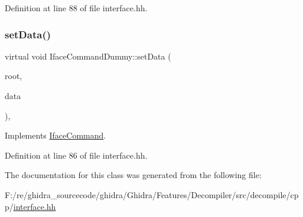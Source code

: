 Definition at line 88 of file interface.\+hh.

\mbox{\label{class_iface_command_dummy_a6cde79d0cd9edb822fa594259de68826}} 
\subsubsection{\texorpdfstring{setData()}{setData()}}
{\footnotesize\ttfamily virtual void Iface\+Command\+Dummy\+::set\+Data (\begin{DoxyParamCaption}\item[{\mbox{\hyperlink{class_iface_status}{Iface\+Status}} $\ast$}]{root,  }\item[{\mbox{\hyperlink{class_iface_data}{Iface\+Data}} $\ast$}]{data }\end{DoxyParamCaption})\hspace{0.3cm}{\ttfamily [inline]}, {\ttfamily [virtual]}}



Implements \mbox{\hyperlink{class_iface_command_ad0a0ba80d392ef1346c43283a8c3ca90}{Iface\+Command}}.



Definition at line 86 of file interface.\+hh.



The documentation for this class was generated from the following file\+:\begin{DoxyCompactItemize}
\item 
F\+:/re/ghidra\+\_\+sourcecode/ghidra/\+Ghidra/\+Features/\+Decompiler/src/decompile/cpp/\mbox{\hyperlink{interface_8hh}{interface.\+hh}}\end{DoxyCompactItemize}
